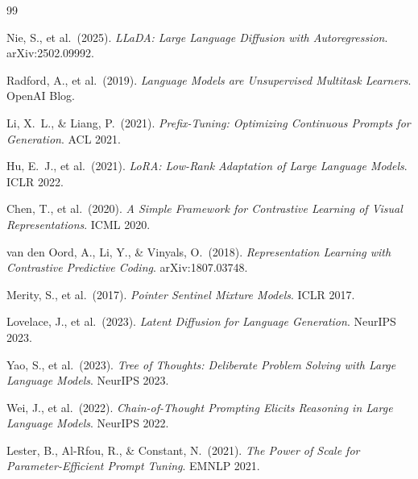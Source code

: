 \documentclass[11pt]{article}
\begin{document}

\begin{thebibliography}{99}

Nie, S., et al.\ (2025).
\textit{LLaDA: Large Language Diffusion with Autoregression}.
arXiv:2502.09992.

Radford, A., et al.\ (2019).
\textit{Language Models are Unsupervised Multitask Learners}.
OpenAI Blog.

Li, X.\ L., \& Liang, P.\ (2021).
\textit{Prefix-Tuning: Optimizing Continuous Prompts for Generation}.
ACL 2021.

Hu, E.\ J., et al.\ (2021).
\textit{LoRA: Low-Rank Adaptation of Large Language Models}.
ICLR 2022.

Chen, T., et al.\ (2020).
\textit{A Simple Framework for Contrastive Learning of Visual Representations}.
ICML 2020.

van den Oord, A., Li, Y., \& Vinyals, O.\ (2018).
\textit{Representation Learning with Contrastive Predictive Coding}.
arXiv:1807.03748.

Merity, S., et al.\ (2017).
\textit{Pointer Sentinel Mixture Models}.
ICLR 2017.

Lovelace, J., et al.\ (2023).
\textit{Latent Diffusion for Language Generation}.
NeurIPS 2023.

Yao, S., et al.\ (2023).
\textit{Tree of Thoughts: Deliberate Problem Solving with Large Language Models}.
NeurIPS 2023.

Wei, J., et al.\ (2022).
\textit{Chain-of-Thought Prompting Elicits Reasoning in Large Language Models}.
NeurIPS 2022.

Lester, B., Al-Rfou, R., \& Constant, N.\ (2021).
\textit{The Power of Scale for Parameter-Efficient Prompt Tuning}.
EMNLP 2021.

\end{thebibliography}
\end{document}
